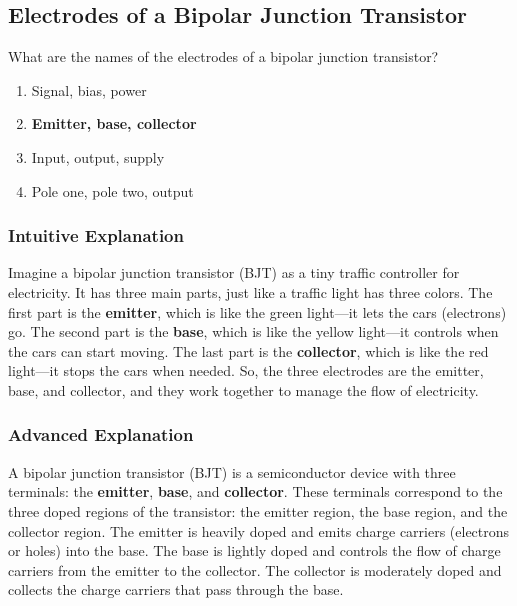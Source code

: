 \subsection{Electrodes of a Bipolar Junction Transistor}
\label{T6B12}

\begin{tcolorbox}[colback=gray!10!white,colframe=black!75!black,title=T6B12]
What are the names of the electrodes of a bipolar junction transistor?
\begin{enumerate}[label=\Alph*)]
    \item Signal, bias, power
    \item \textbf{Emitter, base, collector}
    \item Input, output, supply
    \item Pole one, pole two, output
\end{enumerate}
\end{tcolorbox}

\subsubsection{Intuitive Explanation}
Imagine a bipolar junction transistor (BJT) as a tiny traffic controller for electricity. It has three main parts, just like a traffic light has three colors. The first part is the \textbf{emitter}, which is like the green light—it lets the cars (electrons) go. The second part is the \textbf{base}, which is like the yellow light—it controls when the cars can start moving. The last part is the \textbf{collector}, which is like the red light—it stops the cars when needed. So, the three electrodes are the emitter, base, and collector, and they work together to manage the flow of electricity.

\subsubsection{Advanced Explanation}
A bipolar junction transistor (BJT) is a semiconductor device with three terminals: the \textbf{emitter}, \textbf{base}, and \textbf{collector}. These terminals correspond to the three doped regions of the transistor: the emitter region, the base region, and the collector region. The emitter is heavily doped and emits charge carriers (electrons or holes) into the base. The base is lightly doped and controls the flow of charge carriers from the emitter to the collector. The collector is moderately doped and collects the charge carriers that pass through the base.

